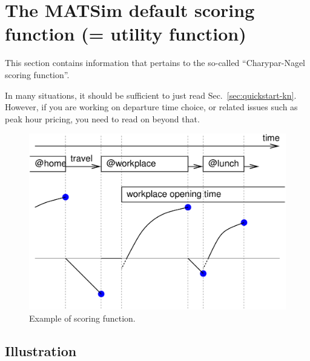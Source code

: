 \chapter{The MATSim default scoring function (= utility function)}


\def\betaperf{\beta_{\it perf}}

\bigskip




This section contains information that pertains to the so-called ``Charypar-Nagel scoring function''.

In many situations, it should be sufficient to just read Sec.~\ref{sec:quickstart-kn}.  However, if you are working on departure time choice, or related issues such as peak hour pricing, you need to read on beyond that.

\umbruch

\begin{figure}[h]
\centerline{%
\includegraphics[width=0.6\hsize]{figures/scoringFunction/scoring-example-wo-marginal}
}
\caption{Example of scoring function.}
\label{fig:scoring-example-wo-marginal}
\end{figure}

\section{Illustration}

